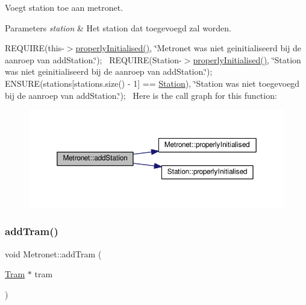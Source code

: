 Voegt station toe aan metronet. 


\begin{DoxyParams}{Parameters}
{\em station} & Het station dat toegevoegd zal worden.\\
\hline
\end{DoxyParams}
R\+E\+Q\+U\+I\+RE(this-\/$>$\hyperlink{class_metronet_a3d2adce29a947f162924279b766de645}{properly\+Initialised()}, \char`\"{}\+Metronet was niet geinitialiseerd bij de aanroep van add\+Station.\char`\"{});~\newline
R\+E\+Q\+U\+I\+RE(Station-\/$>$\hyperlink{class_metronet_a3d2adce29a947f162924279b766de645}{properly\+Initialised()}, \char`\"{}\+Station was niet geinitialiseerd bij de aanroep van add\+Station.\char`\"{});~\newline
E\+N\+S\+U\+RE(stations\mbox{[}stations.\+size() -\/ 1\mbox{]} == \hyperlink{class_station}{Station}), \char`\"{}\+Station was niet toegevoegd bij de aanroep van add\+Station.\char`\"{});~\newline
Here is the call graph for this function\+:\nopagebreak
\begin{figure}[H]
\begin{center}
\leavevmode
\includegraphics[width=350pt]{class_metronet_ac7f4069e577cd4dddb1e166923df3ecb_cgraph}
\end{center}
\end{figure}
\mbox{\label{class_metronet_a3a01132772f4a367d83af40a3c02e224}} 
\subsubsection{\texorpdfstring{add\+Tram()}{addTram()}}
{\footnotesize\ttfamily void Metronet\+::add\+Tram (\begin{DoxyParamCaption}\item[{\hyperlink{class_tram}{Tram} $\ast$}]{tram }\end{DoxyParamCaption})}



